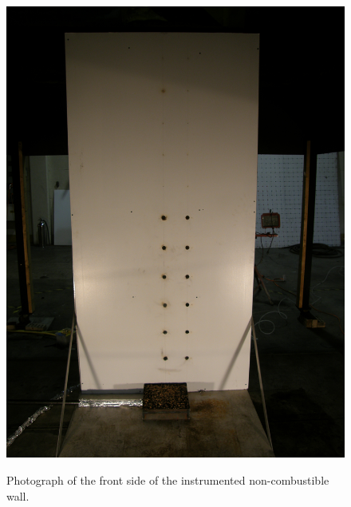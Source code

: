 \documentclass[twoside]{uocthesis}
\begin{document}
{\begin{figure}
	\centering
	\includegraphics[width=\textwidth]{../Figures/Instrumented_Wall_Front_photo}\\
	\caption[Photograph of the front side of the instrumented non-combustible wall]{Photograph of the front side of the instrumented non-combustible wall.}
	\label{Instrumented_Wall_Front_photo}
\end{figure}

}
\end{document}
